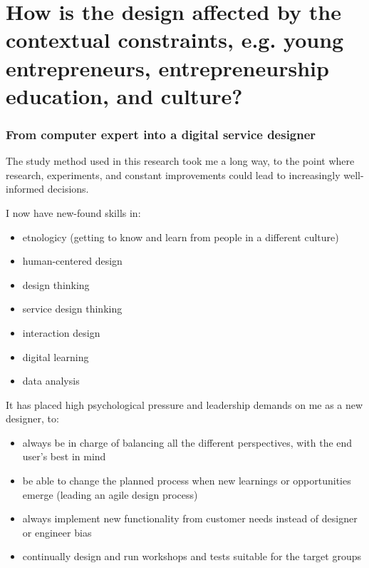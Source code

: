 
\section{How is the design affected by the contextual constraints, e.g. young entrepreneurs, entrepreneurship education, and culture?} %

  \subsubsection{From computer expert into a digital service designer}
  The study method used in this research took me a long way, to the point where research, experiments, and constant improvements could lead to increasingly well-informed decisions.

  I now have new-found skills in:
  \begin{itemize}
  \item etnologicy (getting to know and learn from people in a different culture)
  \item human-centered design
  \item design thinking
  \item service design thinking
  \item interaction design
  \item digital learning
  \item data analysis
  \end{itemize}

  It has placed high psychological pressure and leadership demands on me as a new designer, to:
  \begin{itemize}
  \item always be in charge of balancing all the different perspectives, with the end user's best in mind
  \item be able to change the planned process when new learnings or opportunities emerge (leading an agile design process)
  \item always implement new functionality from customer needs instead of designer or engineer bias
  \item continually design and run workshops and tests suitable for the target groups
  \end{itemize}

